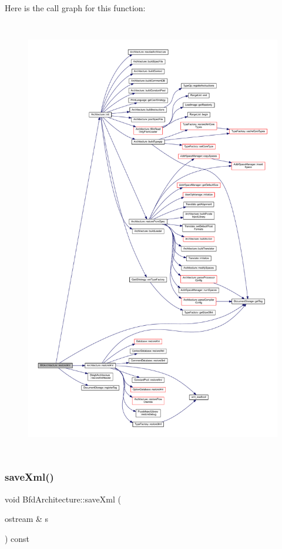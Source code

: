 Here is the call graph for this function\+:
\nopagebreak
\begin{figure}[H]
\begin{center}
\leavevmode
\includegraphics[height=550pt]{class_bfd_architecture_a577d1f082486f2cd6f134d1ce5eb3989_cgraph}
\end{center}
\end{figure}
\mbox{\label{class_bfd_architecture_ac775d8894dd3abba1effafe22881a131}} 
\subsubsection{\texorpdfstring{saveXml()}{saveXml()}}
{\footnotesize\ttfamily void Bfd\+Architecture\+::save\+Xml (\begin{DoxyParamCaption}\item[{ostream \&}]{s }\end{DoxyParamCaption}) const\hspace{0.3cm}{\ttfamily [virtual]}}



